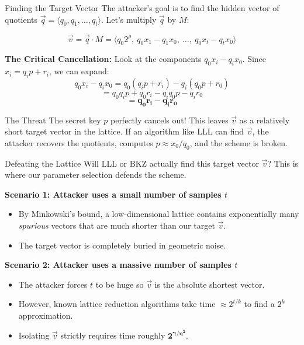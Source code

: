 \documentclass[10pt, aspectratio=169]{beamer}
\begin{document}
\begin{frame}{Finding the Target Vector}
    The attacker's goal is to find the hidden vector of quotients $\vec{q} = \langle q_0, q_1, \dots, q_t \rangle$. Let's multiply $\vec{q}$ by $M$:
    
    $$ \vec{v} = \vec{q} \cdot M = \langle q_0 2^\rho, \ q_0 x_1 - q_1 x_0, \ \dots, \ q_0 x_t - q_t x_0 \rangle $$
    \pause
    
    \vspace{0.3cm}
    \textbf{The Critical Cancellation:} 
    Look at the components $q_0 x_i - q_i x_0$. Since $x_i = q_i p + r_i$, we can expand:
    $$ q_0 x_i - q_i x_0 = q_0(q_i p + r_i) - q_i(q_0 p + r_0) $$
    $$ = q_0 q_i p + q_0 r_i - q_i q_0 p - q_i r_0 $$
    $$ = \mathbf{q_0 r_i - q_i r_0} $$
    \pause
    
    \begin{block}{The Threat}
    The secret key $p$ perfectly cancels out! This leaves $\vec{v}$ as a relatively short target vector in the lattice. If an algorithm like LLL can find $\vec{v}$, the attacker recovers the quotients, computes $p \approx x_0 / q_0$, and the scheme is broken.
    \end{block}
\end{frame}

\begin{frame}{Defeating the Lattice}
    Will LLL or BKZ actually find this target vector $\vec{v}$? This is where our parameter selection defends the scheme.
    \pause
    
    \vspace{0.3cm}
    \textbf{Scenario 1: Attacker uses a small number of samples $t$}
    \begin{itemize}
        \item By Minkowski's bound, a low-dimensional lattice contains exponentially many \textit{spurious} vectors that are much shorter than our target $\vec{v}$. 
        \item The target vector is completely buried in geometric noise.
    \end{itemize}
    \pause
    
    \vspace{0.3cm}
    \textbf{Scenario 2: Attacker uses a massive number of samples $t$}
    \begin{itemize}
        \item The attacker forces $t$ to be huge so $\vec{v}$ is the absolute shortest vector.
        \item However, known lattice reduction algorithms take time $\approx 2^{t/k}$ to find a $2^k$ approximation.
        \item Isolating $\vec{v}$ strictly requires time roughly $\mathbf{2^{\gamma / \eta^2}}$.
    \end{itemize}
\end{frame}
\end{document}

